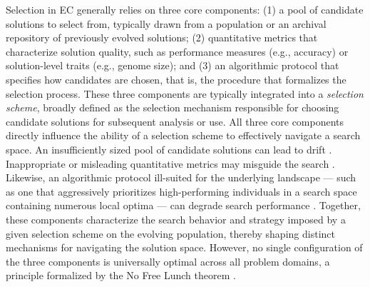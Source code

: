 Selection in EC generally relies on three core components:
(1) a pool of candidate solutions to select from, typically drawn from a population or an archival repository of previously evolved solutions;
(2) quantitative metrics that characterize solution quality, such as performance measures (e.g., accuracy) or solution-level traits (e.g., genome size);
and (3) an algorithmic protocol that specifies how candidates are chosen, that is, the procedure that formalizes the selection process.
These three components are typically integrated into a \textit{selection scheme}, broadly defined as the selection mechanism responsible for choosing candidate solutions for subsequent analysis or use.
All three core components directly influence the ability of a selection scheme to effectively navigate a search space.
An insufficiently sized pool of candidate solutions can lead to drift \citep{rogers1999genetic}.
Inappropriate or misleading quantitative metrics may misguide the search \citep{dolson2018applying}.
Likewise, an algorithmic protocol ill-suited for the underlying landscape --- such as one that aggressively prioritizes high-performing individuals in a search space containing numerous local optima --- can degrade search performance \citep{mouret2015illuminating,helmuth2015lexicase,lehman2011novelty}.
Together, these components characterize the search behavior and strategy imposed by a given selection scheme on the evolving population, thereby shaping distinct mechanisms for navigating the solution space.
However, no single configuration of the three components is universally optimal across all problem domains, a principle formalized by the No Free Lunch theorem \citep{wolpert1997no}.


